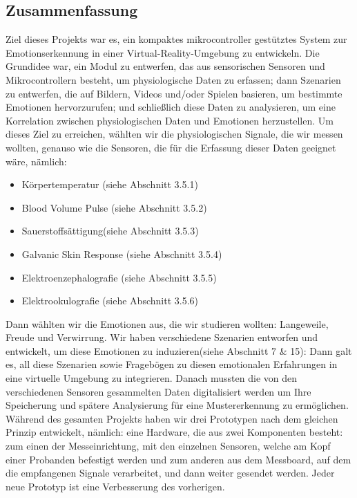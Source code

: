 \subsection{Zusammenfassung} \label{zusammenfassung-subsec}


Ziel dieses Projekts war es, ein kompaktes mikrocontroller gestütztes System zur Emotionserkennung in einer Virtual-Reality-Umgebung zu entwickeln. 
Die Grundidee war, ein Modul zu entwerfen, das aus sensorischen Sensoren und Mikrocontrollern besteht, um physiologische Daten zu erfassen; dann Szenarien zu entwerfen, die auf Bildern, Videos und/oder Spielen basieren, um bestimmte Emotionen hervorzurufen; und schließlich diese Daten zu analysieren, um eine Korrelation zwischen physiologischen Daten und Emotionen herzustellen.
Um dieses Ziel zu erreichen, wählten wir die physiologischen Signale, die wir messen wollten, genauso wie die Sensoren, die für die Erfassung dieser Daten geeignet wäre, nämlich: 
\begin{itemize} \setlength\itemsep{-0.15cm}
  \item Körpertemperatur (siehe Abschnitt 3.5.1) 
  \item Blood Volume Pulse (siehe Abschnitt 3.5.2) 
  \item Sauerstoffsättigung(siehe Abschnitt 3.5.3) 
  \item Galvanic Skin Response (siehe Abschnitt 3.5.4) 
  \item Elektroenzephalografie (siehe Abschnitt 3.5.5) 
  \item Elektrookulografie (siehe Abschnitt 3.5.6) 
\end{itemize}


Dann wählten wir die Emotionen aus, die wir studieren wollten: Langeweile, Freude und Verwirrung.  
Wir haben verschiedene Szenarien entworfen und entwickelt, um diese Emotionen zu induzieren(siehe Abschnitt 7 \& 15): Dann galt es, all diese Szenarien sowie Fragebögen zu diesen emotionalen Erfahrungen in eine virtuelle Umgebung zu integrieren. 
Danach mussten die von den verschiedenen Sensoren gesammelten Daten digitalisiert werden um Ihre Speicherung und spätere Analysierung für eine Mustererkennung zu ermöglichen.
Während des gesamten Projekts haben wir drei Prototypen nach dem gleichen Prinzip entwickelt, nämlich: 
eine Hardware, die aus zwei Komponenten besteht: 
zum einen der Messeinrichtung, mit den einzelnen Sensoren, welche am Kopf einer Probanden befestigt werden und zum anderen aus dem Messboard, auf dem die empfangenen Signale verarbeitet, und dann weiter gesendet werden. 
Jeder neue Prototyp ist eine Verbesserung des vorherigen. \\

